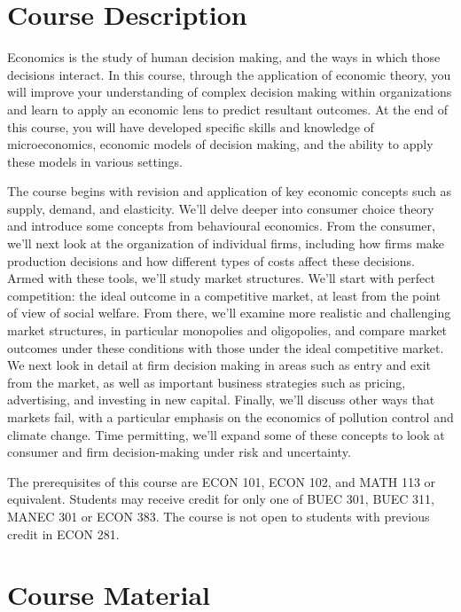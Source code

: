 \documentclass[11pt,]{article}
\begin{document}
\hypertarget{course-description}{%
\section{Course Description}\label{course-description}}

Economics is the study of human decision making, and the ways in which
those decisions interact. In this course, through the application of
economic theory, you will improve your understanding of complex decision
making within organizations and learn to apply an economic lens to
predict resultant outcomes. At the end of this course, you will have
developed specific skills and knowledge of microeconomics, economic
models of decision making, and the ability to apply these models in
various settings.

The course begins with revision and application of key economic concepts
such as supply, demand, and elasticity. We'll delve deeper into consumer
choice theory and introduce some concepts from behavioural economics.
From the consumer, we'll next look at the organization of individual
firms, including how firms make production decisions and how different
types of costs affect these decisions. Armed with these tools, we'll
study market structures. We'll start with perfect competition: the ideal
outcome in a competitive market, at least from the point of view of
social welfare. From there, we'll examine more realistic and challenging
market structures, in particular monopolies and oligopolies, and compare
market outcomes under these conditions with those under the ideal
competitive market. We next look in detail at firm decision making in
areas such as entry and exit from the market, as well as important
business strategies such as pricing, advertising, and investing in new
capital. Finally, we'll discuss other ways that markets fail, with a
particular emphasis on the economics of pollution control and climate
change. Time permitting, we'll expand some of these concepts to look at
consumer and firm decision-making under risk and uncertainty.

The prerequisites of this course are ECON 101, ECON 102, and MATH 113 or
equivalent. Students may receive credit for only one of BUEC 301, BUEC
311, MANEC 301 or ECON 383. The course is not open to students with
previous credit in ECON 281.

\hypertarget{course-material}{%
\section{Course Material}\label{course-material}}
\end{document}

